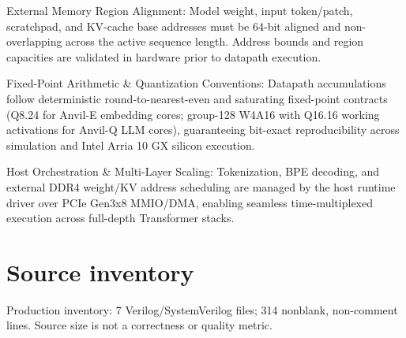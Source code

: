 \documentclass[11pt,a4paper]{article}
\begin{document}
External Memory Region Alignment: Model weight,\allowbreak{} input token/\allowbreak{}patch,\allowbreak{} scratchpad,\allowbreak{} and KV-cache base addresses must be 64-bit aligned and non-overlapping across the active sequence length. Address bounds and region capacities are validated in hardware prior to datapath execution.


Fixed-Point Arithmetic \& Quantization Conventions: Datapath accumulations follow deterministic round-to-nearest-even and saturating fixed-point contracts (\allowbreak{}Q8.24 for Anvil-E embedding cores; group-128 W4A16 with Q16.16 working activations for Anvil-Q LLM cores)\allowbreak{},\allowbreak{} guaranteeing bit-exact reproducibility across simulation and Intel Arria 10 GX silicon execution.


Host Orchestration \& Multi-Layer Scaling: Tokenization,\allowbreak{} BPE decoding,\allowbreak{} and external DDR4 weight/\allowbreak{}KV address scheduling are managed by the host runtime driver over PCIe Gen3x8 MMIO/\allowbreak{}DMA,\allowbreak{} enabling seamless time-multiplexed execution across full-depth Transformer stacks.


\appendix{}\section{Source inventory}

Production inventory: 7 Verilog/\allowbreak{}SystemVerilog files; 314 nonblank,\allowbreak{} non-comment lines. Source size is not a correctness or quality metric.
\end{document}
